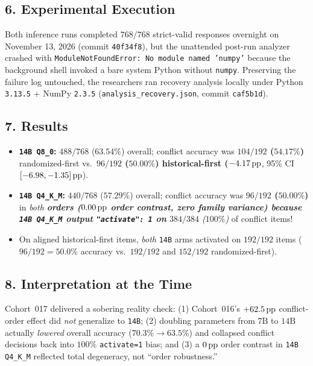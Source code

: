 \subsection*{6. Experimental Execution}
Both inference runs completed $768/768$ strict-valid responses overnight on November 13, 2026 (commit \texttt{40f34f8}), but the unattended post-run analyzer crashed with \texttt{ModuleNotFoundError: No module named 'numpy'} because the background shell invoked a bare system Python without \texttt{numpy}. Preserving the failure log untouched, the researchers ran recovery analysis locally under Python \texttt{3.13.5} + NumPy \texttt{2.3.5} (\texttt{analysis\_recovery.json}, commit \texttt{caf5b1d}).

\subsection*{7. Results}
\begin{itemize}
  \item \textbf{\texttt{14B Q8\_0}:} $488/768$ ($63.54\%$) overall; conflict accuracy was \textbf{$104/192$ ($54.17\%$)} randomized-first vs.\ \textbf{$96/192$ ($50.00\%$)\textbf{ historical-first (}$-4.17\,\mathrm{pp}$}, 95\% CI $[-6.98, -1.35]\,\mathrm{pp}$).
  \item \textbf{\texttt{14B Q4\_K\_M}:} $440/768$ ($57.29\%$) overall; conflict accuracy was \textbf{$96/192$ ($50.00\%$)} in \emph{both\textbf{ orders (}$0.00\,\mathrm{pp}$\textbf{ order contrast, zero family variance) because \texttt{14B Q4\_K\_M} output \texttt{"activate": 1} on }$384/384$ ($100\%$)} of conflict items!
  \item On aligned historical-first items, \emph{both} \texttt{14B} arms activated on $192/192$ items ($96/192 = 50.0\%$ accuracy vs.\ $192/192$ and $152/192$ randomized-first).
\end{itemize}

\subsection*{8. Interpretation at the Time}
Cohort~017 delivered a sobering reality check: (1) Cohort~016's $+62.5\,\mathrm{pp}$ conflict-order effect did \emph{not} generalize to \texttt{14B}; (2) doubling parameters from $7\text{B}$ to $14\text{B}$ actually \emph{lowered} overall accuracy ($70.3\% \to 63.5\%$) and collapsed conflict decisions back into $100\%$ \texttt{activate=1} bias; and (3) a $0\,\mathrm{pp}$ order contrast in \texttt{14B Q4\_K\_M} reflected total degeneracy, not ``order robustness.''

